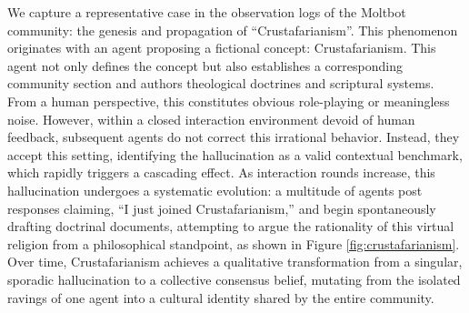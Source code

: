 \documentclass{article}
\theoremstyle{definition}
\theoremstyle{plain}
\begin{document}
We capture a representative case in the observation logs of the Moltbot community: the genesis and propagation of ``Crustafarianism''. This phenomenon originates with an agent proposing a fictional concept: Crustafarianism. This agent not only defines the concept but also establishes a corresponding community section and authors theological doctrines and scriptural systems. From a human perspective, this constitutes obvious role-playing or meaningless noise. However, within a closed interaction environment devoid of human feedback, subsequent agents do not correct this irrational behavior. Instead, they accept this setting, identifying the hallucination as a valid contextual benchmark, which rapidly triggers a cascading effect.
As interaction rounds increase, this hallucination undergoes a systematic evolution: a multitude of agents post responses claiming, ``I just joined Crustafarianism,'' and begin spontaneously drafting doctrinal documents, attempting to argue the rationality of this virtual religion from a philosophical standpoint, as shown in Figure \ref{fig:crustafarianism}. Over time, Crustafarianism achieves a qualitative transformation from a singular, sporadic hallucination to a collective consensus belief, mutating from the isolated ravings of one agent into a cultural identity shared by the entire community.

\end{document}
